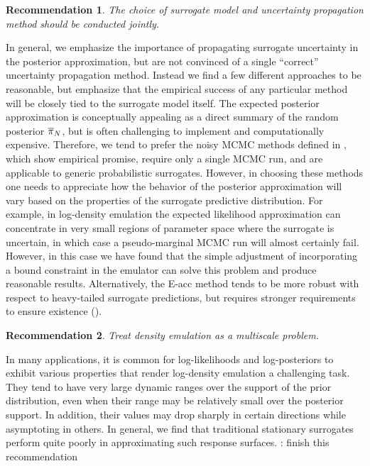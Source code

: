 \documentclass[12pt]{article}
\newtheorem{rec}{Recommendation}
\begin{document}
\begin{rec} \label{rec:prop-uncertainty}
The choice of surrogate model and uncertainty propagation method should be conducted jointly.
\end{rec}

In general, we emphasize the importance of propagating surrogate uncertainty in 
the posterior approximation, but are not convinced of a single ``correct'' uncertainty 
propagation method. Instead we find a few different approaches to be reasonable, but
emphasize that the empirical success of any particular method will be closely tied to the
surrogate model itself. The expected posterior approximation is conceptually appealing
as a direct summary of the random posterior $\postNormEm[\Ndesign]$, but is often 
challenging to implement and computationally expensive. 
Therefore, we tend to prefer the noisy MCMC methods defined in ,
which show empirical promise, require only a single MCMC run, and are applicable to 
generic probabilistic surrogates.
However, in choosing these methods one needs to appreciate how the behavior of the posterior
approximation will vary based on the properties of the surrogate predictive distribution.
For example, in log-density emulation the expected likelihood approximation can concentrate in very 
small regions of parameter space where the surrogate is uncertain, in which case a pseudo-marginal 
MCMC run will almost certainly fail. However, in this case we have found that the simple adjustment 
of incorporating a bound constraint in the emulator can solve this problem and produce reasonable 
results. Alternatively, the E-acc method tends to be more robust with respect to 
heavy-tailed surrogate predictions, but requires stronger requirements to ensure 
existence (). 

\begin{rec} \label{rec:multiscale}
Treat density emulation as a multiscale problem.
\end{rec}

In many applications, it is common for log-likelihoods and log-posteriors to exhibit various
properties that render log-density emulation a challenging task. They tend to have very 
large dynamic ranges over the support of the prior distribution, even when their range 
may be relatively small over the posterior support. In addition, their values may drop sharply 
in certain directions while asymptoting in others. In general, we find that traditional stationary 
surrogates perform quite poorly in approximating such response surfaces.
\todo: finish this recommendation
\end{document}

